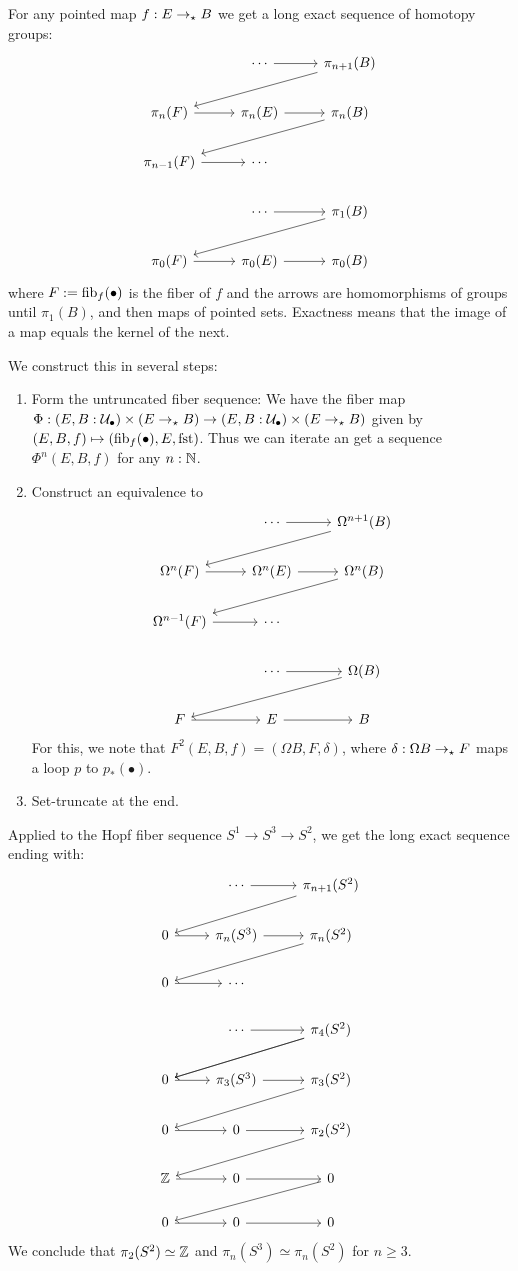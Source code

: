 \documentclass[10pt,oneside,leqno,openright]{memoir}
\begin{document}
For any pointed map $f : E \to_\star B$ we get a long exact sequence of homotopy groups:
\[
  \begin{tikzcd}
    & \cdots\ar[r] & \pi_{n+1}(B) \ar[dll] \\
    \pi_n(F)\ar[r] & \pi_n(E)\ar[r] & \pi_n(B) \ar[dll] \\
    \pi_{n-1}(F)\ar[r] & \cdots &\\
    &\cdots\ar[r] & \pi_1(B) \ar[dll] \\
    \pi_0(F)\ar[r] & \pi_0(E)\ar[r] & \pi_0(B)
  \end{tikzcd}
\]
where $F:=\operatorname{fib}_f(\bullet)$ is the fiber of $f$ and the arrows are homomorphisms of groups until
$\pi_1(B)$, and then maps of pointed sets.
Exactness means that the image of a map equals the kernel of the next.

We construct this in several steps:
\begin{enumerate}
\item Form the untruncated fiber sequence: We have the fiber map $\Phi : (E,B:\mathcal{U}_\bullet)\times(E \to_\star B) \to (E,B:\mathcal{U}_\bullet)\times(E\to_\star B)$ given by $(E,B,f) \mapsto (\operatorname{fib}_f(\bullet), E, \operatorname{fst})$.
  Thus we can iterate an get a sequence $\Phi^n(E,B,f)$ for any $n:\mathbb{N}$.
\item Construct an equivalence to
\[
  \begin{tikzcd}
    & \cdots\ar[r] & \Omega^{n+1}(B) \ar[dll] \\
    \Omega^n(F)\ar[r] & \Omega^n(E)\ar[r] & \Omega^n(B) \ar[dll] \\
    \Omega^{n-1}(F)\ar[r] & \cdots &\\
    &\cdots\ar[r] & \Omega(B) \ar[dll] \\
    F\ar[r] & E\ar[r] & B
  \end{tikzcd}
\]
For this, we note that $F^2(E,B,f) = (\Omega B, F, \delta)$,
where $\delta : \Omega B \to_\star F$ maps a loop $p$ to $p_*(\bullet)$.
\item Set-truncate at the end.
\end{enumerate}
Applied to the Hopf fiber sequence $S^1 \to S^3 \to S^2$, we get the long exact sequence ending with:
\[
  \begin{tikzcd}
    & \cdots\ar[r] & \pi_{n+1}(S^2) \ar[dll] \\
    0\ar[r] & \pi_n(S^3)\ar[r] & \pi_n(S^2) \ar[dll] \\
    0\ar[r] & \cdots &\\
    &\cdots\ar[r] & \pi_4(S^2) \ar[dll]\ar[dll]  \\
    0\ar[r] & \pi_3(S^3)\ar[r] & \pi_3(S^2)\ar[dll]  \\
    0\ar[r] & 0\ar[r] & \pi_2(S^2)\ar[dll]  \\
    \ZZ\ar[r] & 0\ar[r] & 0\ar[dll]  \\
    0\ar[r] & 0\ar[r] & 0
  \end{tikzcd}
\]
We conclude that $\pi_2(S^2)\simeq \mathbb{Z}$ and $\pi_n(S^3)\simeq\pi_n(S^2)$ for $n\ge 3$.
\end{document}
